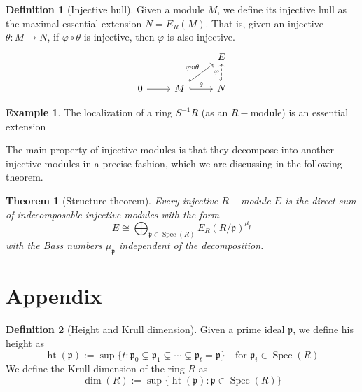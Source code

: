 \documentclass[leqno]{article}
\newtheorem{theorem}{Theorem}[section]
\theoremstyle{definition}
\newtheorem{definition}{Definition}[section]
\newtheorem{example}{Example}[section]
\DeclareMathOperator{\heigth}{ht}
\DeclareMathOperator{\Spec}{Spec}
\begin{document}
\begin{definition}[Injective hull] Given a module $M$, we define its injective hull as the maximal essential extension $N = E_R(M)$. That is, given an injective $\theta :M\to N$, if $\varphi \circ \theta $  is injective, then $\varphi $ is also injective.
\[\begin{tikzcd}
	&& E \\
	0 & M & N
	\arrow[from=2-1, to=2-2]
	\arrow["\theta", hook, from=2-2, to=2-3]
	\arrow["\varphi", dashed, hook, from=2-3, to=1-3]
	\arrow["\varphi\circ\theta", hook, from=2-2, to=1-3]
\end{tikzcd}\]
\end{definition}

\begin{example} The localization of a ring $S^{-1}R$ (as an $R-$module) is an essential extension
\end{example}

The main property of injective modules is that they decompose into another injective modules in a precise fashion, which we are discussing in the following theorem.

\begin{theorem}[Structure theorem] Every injective $R-$module $E$ is the direct sum of indecomposable injective modules with the form
  \[
	E \cong \bigoplus _{\mathfrak{p}\in \Spec (R)} E_R( R / \mathfrak{p})^{\mu _{\mathfrak{p}}}
  \] 
with the \textit{Bass numbers} $\mu _{\mathfrak{p}}$ independent of the decomposition.
\end{theorem}








\section{Appendix}

\begin{definition}[Height and Krull dimension] Given a prime ideal $\mathfrak{p}$, we define his height as
  \[
	\heigth (\mathfrak{p}) := \sup \{t: \mathfrak{p}_0 \subsetneq \mathfrak{p}_1 \subsetneq \cdots \subsetneq  \mathfrak{p}_t = \mathfrak{p} \} \quad \text{for } \mathfrak{p}_i\in \Spec(R)
  \]
We define the Krull dimension of the ring $R$ as
 \[
 \dim (R) :=  \sup \{\heigth (\mathfrak{p}) : \mathfrak{p}\in \Spec(R)\}
\] 
\end{definition}
\end{document}

